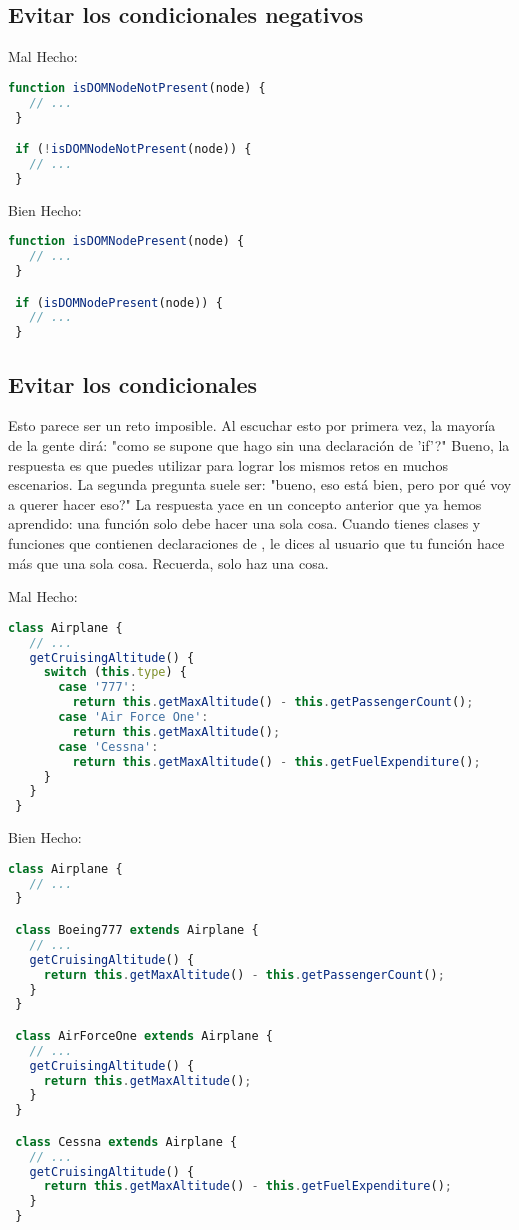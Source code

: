 \subsection*{Evitar los condicionales negativos}

Mal Hecho:
\begin{lstlisting}[language=TypeScript, style=badstyle]
 function isDOMNodeNotPresent(node) {
   // ...
 }

 if (!isDOMNodeNotPresent(node)) {
   // ...
 }
\end{lstlisting}
\newpage

Bien Hecho:
\begin{lstlisting}[language=TypeScript, style=goodstyle]
 function isDOMNodePresent(node) {
   // ...
 }

 if (isDOMNodePresent(node)) {
   // ...
 }
\end{lstlisting}

\subsection*{Evitar los condicionales}

Esto parece ser un reto imposible. Al escuchar esto por primera vez, la mayoría de la gente dirá: "como se supone que hago sin una declaración de 'if'?" Bueno, la respuesta es que puedes utilizar para lograr los mismos retos en muchos escenarios. La segunda pregunta suele ser: "bueno, eso está bien, pero por qué voy a querer hacer eso?" La respuesta yace en un concepto anterior que ya hemos aprendido: una función solo debe hacer una sola cosa. Cuando tienes clases y funciones que contienen declaraciones de , le dices al usuario que tu función hace más que una sola cosa. Recuerda, solo haz una cosa.

Mal Hecho:
\begin{lstlisting}[language=TypeScript, style=badstyle]
 class Airplane {
   // ...
   getCruisingAltitude() {
     switch (this.type) {
       case '777':
         return this.getMaxAltitude() - this.getPassengerCount();
       case 'Air Force One':
         return this.getMaxAltitude();
       case 'Cessna':
         return this.getMaxAltitude() - this.getFuelExpenditure();
     }
   }
 }
\end{lstlisting}
\vspace{0.5cm} %

Bien Hecho:
\begin{lstlisting}[language=TypeScript, style=goodstyle]
 class Airplane {
   // ...
 }

 class Boeing777 extends Airplane {
   // ...
   getCruisingAltitude() {
     return this.getMaxAltitude() - this.getPassengerCount();
   }
 }

 class AirForceOne extends Airplane {
   // ...
   getCruisingAltitude() {
     return this.getMaxAltitude();
   }
 }

 class Cessna extends Airplane {
   // ...
   getCruisingAltitude() {
     return this.getMaxAltitude() - this.getFuelExpenditure();
   }
 }
\end{lstlisting}

